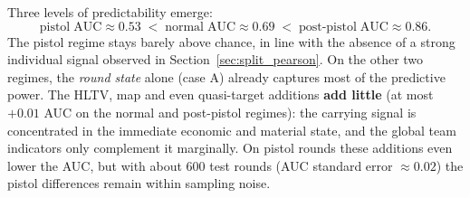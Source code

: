 Three levels of predictability emerge:
\[
\text{pistol}\;\text{AUC}\!\approx\!0.53 \;<\;
\text{normal}\;\text{AUC}\!\approx\!0.69 \;<\;
\text{post-pistol}\;\text{AUC}\!\approx\!0.86.
\]
The pistol regime stays barely above chance, in line with the absence
of a strong individual signal observed in
Section~\ref{sec:split_pearson}. On the other two regimes, the
\emph{round state} alone (case A) already captures most of the
predictive power. The HLTV, map and even quasi-target additions
\textbf{add little} (at most $+0.01$ AUC on the normal and post-pistol
regimes): the carrying signal is concentrated in the immediate
economic and material state, and the global team indicators only
complement it marginally. On pistol rounds these additions even lower
the AUC, but with about 600 test rounds (AUC standard error
$\approx 0.02$) the pistol differences remain within sampling noise.

